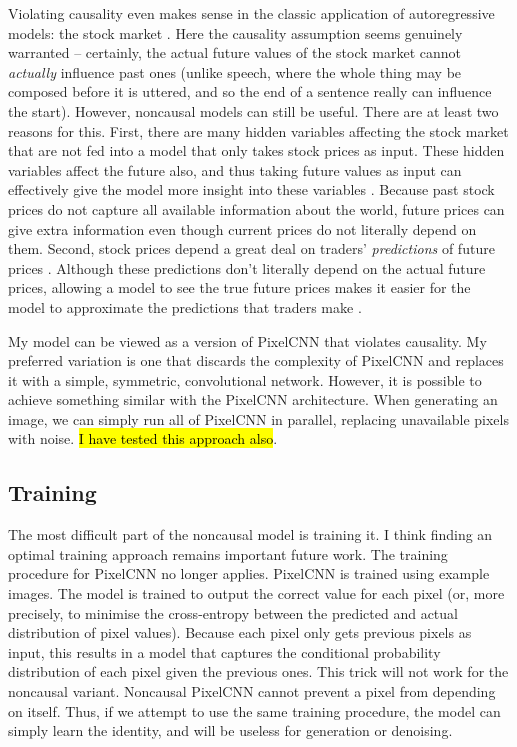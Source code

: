 \documentclass[10pt,a4paper]{article}
\begin{document}
Violating causality even makes sense in the classic application of autoregressive models: the stock market \cite{??}. Here the causality assumption seems genuinely warranted -- certainly, the actual future values of the stock market cannot \emph{actually} influence past ones (unlike speech, where the whole thing may be composed before it is uttered, and so the end of a sentence really can influence the start). However, noncausal models can still be useful. There are at least two reasons for this. First, there are many hidden variables affecting the stock market that are not fed into a model that only takes stock prices as input. These hidden variables affect the future also, and thus taking future values as input can effectively give the model more insight into these variables \cite{??}. Because past stock prices do not capture all available information about the world, future prices can give extra information even though current prices do not literally depend on them. Second, stock prices depend a great deal on traders' \emph{predictions} of future prices \cite{??}. Although these predictions don't literally depend on the actual future prices, allowing a model to see the true future prices makes it easier for the model to approximate the predictions that traders make \cite{??}.

My model can be viewed as a version of PixelCNN that violates causality. My preferred variation is one that discards the complexity of PixelCNN and replaces it with a simple, symmetric, convolutional network. However, it is possible to achieve something similar with the PixelCNN architecture. When generating an image, we can simply run all of PixelCNN in parallel, replacing unavailable pixels with noise. \hl{I have tested this approach also}.

\subsection{Training}

The most difficult part of the noncausal model is training it. I think finding an optimal training approach remains important future work. The training procedure for PixelCNN no longer applies. PixelCNN is trained using example images. The model is trained to output the correct value for each pixel (or, more precisely, to minimise the cross-entropy between the predicted and actual distribution of pixel values). Because each pixel only gets previous pixels as input, this results in a model that captures the conditional probability distribution of each pixel given the previous ones. This trick will not work for the noncausal variant. Noncausal PixelCNN cannot prevent a pixel from depending on itself. Thus, if we attempt to use the same training procedure, the model can simply learn the identity, and will be useless for generation or denoising.
\end{document}
